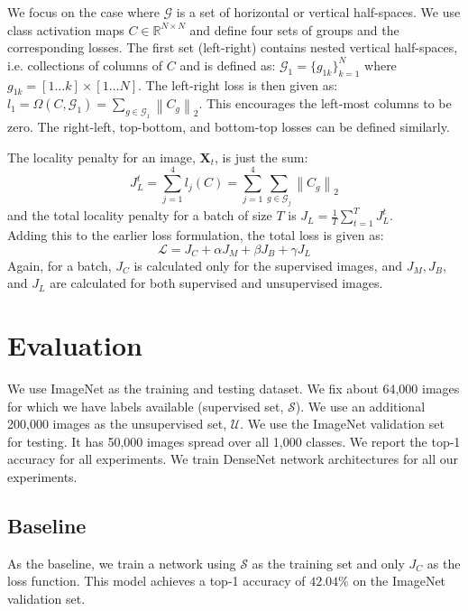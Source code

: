 \documentclass[runningheads]{llncs}
\begin{document}
We focus on the case where $\mathcal{G}$ is a set of horizontal or vertical half-spaces. We use
class activation maps $C \in \mathbb{R}^{N \times N}$ \cite{CAM} and define four sets of groups
and the corresponding losses. The first set (left-right) contains nested vertical half-spaces, i.e.
collections of columns of $C$ and is defined as: $\mathcal{G}_1 = \{g_{1k}\}_{k=1}^{N}$ where $g_{1k} = [1 \dots
k] \times [1 \dots N]$. The left-right loss is then given as: $l_1 = \Omega (C, \mathcal{G}_1) = \sum_{g \in \mathcal{G}_1}
\left \lVert C_g \right \rVert _2$. This encourages the left-most columns to be zero. The right-left,
top-bottom, and bottom-top losses can be defined similarly.

The locality penalty for an image, $\mathbf{X}_t$, is just the sum:
\begin{equation}
	J_L^t = \sum_{j=1}^{4}l_j(C) = \sum_{j=1}^4 \sum_{g \in \mathcal{G}_j} \left\lVert C_g
	\right\rVert_2
\end{equation}
and the total locality penalty for a batch of size $T$ is $J_L = \frac{1}{T} \sum_{t=1}^{T} J_L^t$.\\

Adding this to the earlier loss formulation, the total loss is given as:
\begin{equation}
	\mathcal{L} = J_C + \alpha J_M + \beta J_B + \gamma J_L
\end{equation}
Again, for a batch, $J_C$ is calculated only for the supervised images, and $J_M, J_B, $ and $J_L$
are calculated for both supervised and unsupervised images.


\section{Evaluation}
We use ImageNet as the training and testing dataset. We fix about 64,000 images for which
we have labels available (supervised set, $\mathcal{S}$). We use an additional 200,000 images as the
unsupervised set, $\mathcal{U}$. We use the ImageNet validation set for testing. It has 50,000
images spread over all 1,000 classes. We report the top-1 accuracy for all experiments. We train
DenseNet network architectures for all our experiments.

\subsection{Baseline}
As the baseline, we train a network using $\mathcal{S}$ as the training set and only $J_C$ as the loss
function. This model achieves a top-1 accuracy of $42.04\%$ on the ImageNet validation set. 
\end{document}

